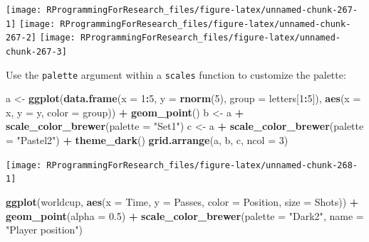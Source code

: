\documentclass[]{book}
\makeatletter
\newenvironment{Shaded}{\begin{snugshade}}{\end{snugshade}}
\newcommand{\KeywordTok}[1]{\textcolor[rgb]{0.13,0.29,0.53}{\textbf{#1}}}
\newcommand{\DataTypeTok}[1]{\textcolor[rgb]{0.13,0.29,0.53}{#1}}
\newcommand{\DecValTok}[1]{\textcolor[rgb]{0.00,0.00,0.81}{#1}}
\newcommand{\FloatTok}[1]{\textcolor[rgb]{0.00,0.00,0.81}{#1}}
\newcommand{\StringTok}[1]{\textcolor[rgb]{0.31,0.60,0.02}{#1}}
\newcommand{\OperatorTok}[1]{\textcolor[rgb]{0.81,0.36,0.00}{\textbf{#1}}}
\newcommand{\NormalTok}[1]{#1}
\newenvironment{kframe}{%
\medskip{}
\setlength{\fboxsep}{.8em}
 \def\at@end@of@kframe{}%
 \ifinner\ifhmode%
  \def\at@end@of@kframe{\end{minipage}}%
  \begin{minipage}{\columnwidth}%
 \fi\fi%
 \def\FrameCommand##1{\hskip\@totalleftmargin \hskip-\fboxsep
 \colorbox{shadecolor}{##1}\hskip-\fboxsep
     \hskip-\linewidth \hskip-\@totalleftmargin \hskip\columnwidth}%
 \MakeFramed {\advance\hsize-\width
   \@totalleftmargin\z@ \linewidth\hsize
   \@setminipage}}%
 {\par\unskip\endMakeFramed%
 \at@end@of@kframe}
\renewenvironment{Shaded}{\begin{kframe}}{\end{kframe}}
\theoremstyle{definition}
\theoremstyle{definition}
\theoremstyle{definition}
\theoremstyle{remark}
\makeatother
\begin{document}
\texttt{[image: RProgrammingForResearch\_files/figure-latex/unnamed-chunk-267-1]}
\texttt{[image: RProgrammingForResearch\_files/figure-latex/unnamed-chunk-267-2]}
\texttt{[image: RProgrammingForResearch\_files/figure-latex/unnamed-chunk-267-3]}

Use the \texttt{palette} argument within a \texttt{scales} function to
customize the palette:

\begin{Shaded}
\begin{Highlighting}[]
\NormalTok{a <-}\StringTok{ }\KeywordTok{ggplot}\NormalTok{(}\KeywordTok{data.frame}\NormalTok{(}\DataTypeTok{x =} \DecValTok{1}\OperatorTok{:}\DecValTok{5}\NormalTok{, }\DataTypeTok{y =} \KeywordTok{rnorm}\NormalTok{(}\DecValTok{5}\NormalTok{),}
                       \DataTypeTok{group =}\NormalTok{ letters[}\DecValTok{1}\OperatorTok{:}\DecValTok{5}\NormalTok{]),}
            \KeywordTok{aes}\NormalTok{(}\DataTypeTok{x =}\NormalTok{ x, }\DataTypeTok{y =}\NormalTok{ y, }\DataTypeTok{color =}\NormalTok{ group)) }\OperatorTok{+}\StringTok{ }
\StringTok{  }\KeywordTok{geom_point}\NormalTok{()}
\NormalTok{b <-}\StringTok{ }\NormalTok{a }\OperatorTok{+}\StringTok{ }\KeywordTok{scale_color_brewer}\NormalTok{(}\DataTypeTok{palette =} \StringTok{"Set1"}\NormalTok{)}
\NormalTok{c <-}\StringTok{ }\NormalTok{a }\OperatorTok{+}\StringTok{ }\KeywordTok{scale_color_brewer}\NormalTok{(}\DataTypeTok{palette =} \StringTok{"Pastel2"}\NormalTok{) }\OperatorTok{+}\StringTok{ }
\StringTok{  }\KeywordTok{theme_dark}\NormalTok{()}
\KeywordTok{grid.arrange}\NormalTok{(a, b, c, }\DataTypeTok{ncol =} \DecValTok{3}\NormalTok{)}
\end{Highlighting}
\end{Shaded}

\texttt{[image: RProgrammingForResearch\_files/figure-latex/unnamed-chunk-268-1]}

\begin{Shaded}
\begin{Highlighting}[]
\KeywordTok{ggplot}\NormalTok{(worldcup, }\KeywordTok{aes}\NormalTok{(}\DataTypeTok{x =}\NormalTok{ Time, }\DataTypeTok{y =}\NormalTok{ Passes,}
                     \DataTypeTok{color =}\NormalTok{ Position, }\DataTypeTok{size =}\NormalTok{ Shots)) }\OperatorTok{+}\StringTok{ }
\StringTok{  }\KeywordTok{geom_point}\NormalTok{(}\DataTypeTok{alpha =} \FloatTok{0.5}\NormalTok{) }\OperatorTok{+}\StringTok{ }
\StringTok{  }\KeywordTok{scale_color_brewer}\NormalTok{(}\DataTypeTok{palette =} \StringTok{"Dark2"}\NormalTok{,}
                     \DataTypeTok{name =} \StringTok{"Player position"}\NormalTok{)}
\end{Highlighting}
\end{Shaded}
\end{document}
